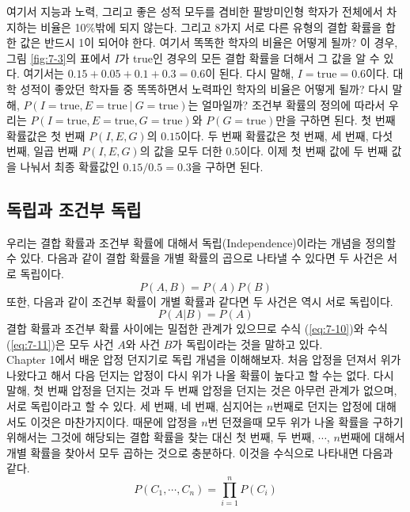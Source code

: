 \documentclass[a4paper]{oblivoir}
\begin{document}
여기서 지능과 노력, 그리고 좋은 성적 모두를 겸비한 팔방미인형 학자가 전체에서 차지하는 비율은 10\%밖에 되지 않는다. 그리고 8가지 서로 다른 유형의 결합 확률을 합한 값은 반드시 1이 되어야 한다. 여기서 똑똑한 학자의 비율은 어떻게 될까? 이 경우, 그림 \ref{fig:7-3}의 표에서 $I$가 true인 경우의 모든 결합 확률을 더해서 그 값을 알 수 있다. 여기서는 $0.15+0.05+0.1+0.3=0.6$이 된다. 다시 말해, $I=\textrm{true}=0.6$이다. 대학 성적이 좋았던 학자들 중 똑똑하면서 노력파인 학자의 비율은 어떻게 될까? 다시 말해, $P(I=\textrm{true}, E=\textrm{true} \ | \ G=\textrm{true})$는 얼마일까? 조건부 확률의 정의에 따라서 우리는 $P(I=\textrm{true}, E=\textrm{true}, G=\textrm{true})$와 $P(G=\textrm{true})$만을 구하면 된다. 첫 번째 확률값은 첫 번째 $P(I,E,G)$의 $0.15$이다. 두 번째 확률값은 첫 번째, 세 번째, 다섯 번째, 일곱 번째 $P(I,E,G)$의 값을 모두 더한 $0.5$이다. 이제 첫 번째 값에 두 번째 값을 나눠서 최종 확률값인 $0.15/0.5 = 0.3$을 구하면 된다. \\

\subsection{독립과 조건부 독립}

우리는 결합 확률과 조건부 확률에 대해서 독립(Independence)이라는 개념을 정의할 수 있다. 다음과 같이 결합 확률을 개별 확률의 곱으로 나타낼 수 있다면 두 사건은 서로 독립이다. 
\begin{equation}
P(A,B) = P(A)P(B)
\label{eq:7-10}
\end{equation}
또한, 다음과 같이 조건부 확률이 개별 확률과 같다면 두 사건은 역시 서로 독립이다. 
\begin{equation}
P(A|B) = P(A)
\label{eq:7-11}
\end{equation}
결합 확률과 조건부 확률 사이에는 밀접한 관계가 있으므로 수식 (\ref{eq:7-10})와 수식 (\ref{eq:7-11})은 모두 사건 $A$와 사건 $B$가 독립이라는 것을 말하고 있다. \\

Chapter 1에서 배운 압정 던지기로 독립 개념을 이해해보자. 처음 압정을 던져서 위가 나왔다고 해서 다음 던지는 압정이 다시 위가 나올 확률이 높다고 할 수는 없다. 다시 말해, 첫 번째 압정을 던지는 것과 두 번째 압정을 던지는 것은 아무런 관계가 없으며, 서로 독립이라고 할 수 있다. 세 번째, 네 번째, 심지어는 $n$번째로 던지는 압정에 대해서도 이것은 마찬가지이다. 때문에 압정을 $n$번 던졌을때 모두 위가 나올 확률을 구하기 위해서는 그것에 해당되는 결합 확률을 찾는 대신 첫 번째, 두 번째, $\cdots$, $n$번째에 대해서 개별 확률을 찾아서 모두 곱하는 것으로 충분하다. 이것을 수식으로 나타내면 다음과 같다.
\begin{equation}
P(C_1,\cdots,C_n) = \prod_{i=1}^{n} P(C_i)
\label{eq:7-12}
\end{equation} \\
\end{document}
